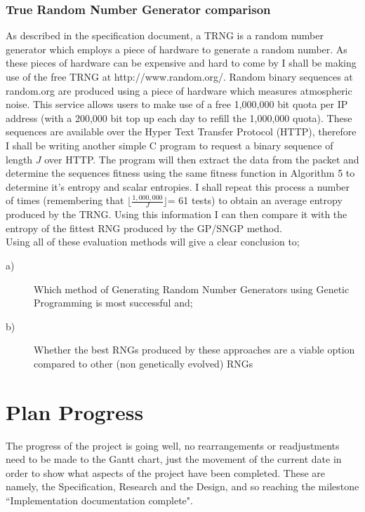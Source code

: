 \documentclass[a4paper,10.5pt]{article}
\begin{document}
\subsubsection{True Random Number Generator comparison}
As described in the specification document, a TRNG is a random number generator which employs a piece of hardware to generate a random number. As these pieces of hardware can be expensive and hard to come by I shall be making use of the free TRNG at http://www.random.org/. Random binary sequences at random.org are produced using a piece of hardware which measures atmospheric noise. This service allows users to make use of a free 1,000,000 bit quota per IP address (with a 200,000 bit top up each day to refill the 1,000,000 quota). These sequences are available over the Hyper Text Transfer Protocol (HTTP), therefore I shall be writing another simple C program to request a binary sequence of length $J$ over HTTP. The program will then extract the data from the packet and determine the sequences fitness using the same fitness function in Algorithm 5 to determine it's entropy and scalar entropies. I shall repeat this process a number of times (remembering that $\lfloor\frac{1,000,000}{J} \rfloor$= 61 tests) to obtain an average entropy produced by the TRNG.
Using this information I can then compare it with the entropy of the fittest RNG produced by the GP/SNGP method. \\

\noindent Using all of these evaluation methods will give a clear conclusion to;
\begin{description}
  \item[a)] Which method of Generating Random Number Generators using Genetic Programming is most successful and;
\item[b)] Whether the best RNGs produced by these approaches are a viable option compared to other (non genetically evolved) RNGs
\end{description}

\section{Plan Progress}
The progress of the project is going well, no rearrangements or readjustments need to be made to the Gantt chart, just the movement of the current date in order to show what aspects of the project have been completed. These are namely, the Specification, Research and the Design, and so reaching the milestone ``Implementation documentation complete".
\end{document}
